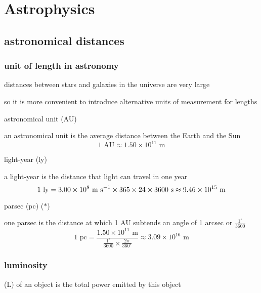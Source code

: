 \section{Astrophysics}

\subsection{astronomical distances}

\subsubsection{unit of length in astronomy}

distances between stars and galaxies in the universe are very large

so it is more convenient to introduce alternative units of measurement for lengths

\cmt astronomical unit (AU)

an astronomical unit is the average distance between the Earth and the Sun
\begin{equation*}
    1 \text{ AU} \approx 1.50 \times 10^{11} \text{ m}	
\end{equation*}

\cmt light-year (ly)

a light-year is the distance that light can travel in one year
\begin{equation*}
	1 \text{ ly} = 3.00\times10^8 \text{ m s$^{-1}$} \times 365 \times 24 \times 3600 \text{ s}  \approx 9.46 \times 10^{15} \text{ m}
\end{equation*}

\cmt parsec (pc) ($\ast$)

one parsec is the distance at which 1 AU subtends an angle of 1 arcsec or $\frac{1^\circ}{3600} $
\begin{equation*}
	1 \text{ pc} = \frac{1.50 \times 10^{11} \text{ m}}{\frac{1^\circ}{3600} \times \frac{2\pi}{360^\circ}} \approx 3.09 \times 10^{16} \text{ m}
\end{equation*}


\subsubsection{luminosity}

\begin{ilight}
	 (L) of an object is the total power emitted by this object
\end{ilight}


